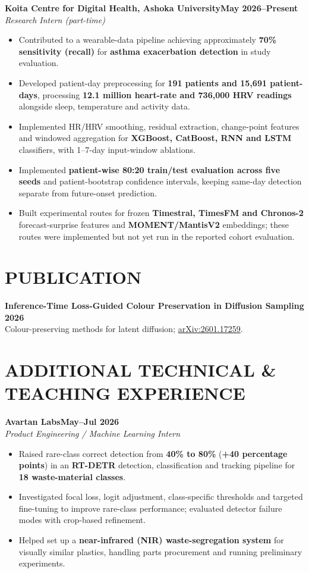 \documentclass[10pt,a4paper]{article}
\newcommand{\entry}[3]{%
  \noindent\textbf{#1}\hfill\textbf{#3}\\[-1pt]
  \textit{#2}\par
}
\newenvironment{cvitems}{%
  \begin{itemize}[leftmargin=1.15em,label=\textbullet,itemsep=2.5pt,topsep=3pt,parsep=0pt,partopsep=0pt]
}{\end{itemize}}
\begin{document}
\entry{Koita Centre for Digital Health, Ashoka University}{Research Intern (part-time)}{May 2026--Present}
\begin{cvitems}
  \item Contributed to a wearable-data pipeline achieving approximately \textbf{70\% sensitivity (recall)} for \textbf{asthma exacerbation detection} in study evaluation.
  \item Developed patient-day preprocessing for \textbf{191 patients and 15,691 patient-days}, processing \textbf{12.1 million heart-rate and 736,000 HRV readings} alongside sleep, temperature and activity data.
  \item Implemented HR/HRV smoothing, residual extraction, change-point features and windowed aggregation for \textbf{XGBoost, CatBoost, RNN and LSTM} classifiers, with 1--7-day input-window ablations.
  \item Implemented \textbf{patient-wise 80:20 train/test evaluation across five seeds} and patient-bootstrap confidence intervals, keeping same-day detection separate from future-onset prediction.
  \item Built experimental routes for frozen \textbf{Timestral, TimesFM and Chronos-2} forecast-surprise features and \textbf{MOMENT/MantisV2} embeddings; these routes were implemented but not yet run in the reported cohort evaluation.
\end{cvitems}

\section{PUBLICATION}
\noindent\textbf{Inference-Time Loss-Guided Colour Preservation in Diffusion Sampling} \hfill \textbf{2026}\\[-1pt]
Colour-preserving methods for latent diffusion; \href{https://arxiv.org/abs/2601.17259}{arXiv:2601.17259}.

\section{ADDITIONAL TECHNICAL \& TEACHING EXPERIENCE}
\entry{Avartan Labs}{Product Engineering / Machine Learning Intern}{May--Jul 2026}
\begin{cvitems}
  \item Raised rare-class correct detection from \textbf{40\% to 80\%} (\textbf{+40 percentage points}) in an \textbf{RT-DETR} detection, classification and tracking pipeline for \textbf{18 waste-material classes}.
  \item Investigated focal loss, logit adjustment, class-specific thresholds and targeted fine-tuning to improve rare-class performance; evaluated detector failure modes with crop-based refinement.
  \item Helped set up a \textbf{near-infrared (NIR) waste-segregation system} for visually similar plastics, handling parts procurement and running preliminary experiments.
\end{cvitems}
\end{document}
